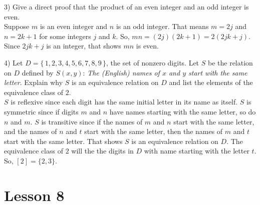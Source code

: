 \documentclass[11pt]{amsart}
\begin{document}
\vfill
\break

3) Give a direct proof that the product of an even integer and an odd integer is even. \\[3pt]
{\color{blue}
Suppose $m$ is an even integer and $n$ is an odd integer. That means $m = 2j$ and $n = 2k+1$ for some integers $j$ and $k$. So, $mn = (2j)(2k+1) = 2(2jk+j)$. Since $2jk+j$ is an integer, that shows $mn$ is even.\\[5pt]
}

\vfill

4) Let $D=\{\, 1, 2, 3, 4, 5, 6, 7, 8, 9\,\}$, the set of nonzero digits. Let $S$ be the
relation on $D$ defined by $S(x,y)$: {\it The (English) names of $x$ and $y$ start with the same letter}. Explain why $S$ is an equivalence relation on $D$ and list the elements of the
equivalence class of $2$.\\[3pt]
{\color{blue} 
$S$ is reflexive since each digit has the same initial letter in its name as itself. $S$ is symmetric since if digits $m$ and $n$ have names starting with the same letter, so do $n$ and $m$. $S$ is transitive since if the names of $m$ and $n$ start with the same letter, and the names of $n$ and $t$ start with the same letter, then the names of $m$ and $t$ start with the same letter. That shows $S$ is an equivalence relation on $D$. The equivalence class of $2$ will the the digits in $D$ with name starting with the letter $t$. So, $[2] = \{2,3\}$.\\[5pt]}

\vfill
\section{Lesson 8}
\end{document}
